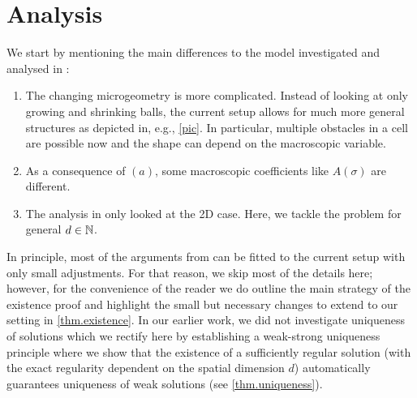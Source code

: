 \documentclass[reqno, 11pt]{amsart}
\numberwithin{equation}{section}
\def\N{{\Bbb N}}
\begin{document}
\section{Analysis}\label{analysis}
We start by mentioning the main differences to the model investigated and analysed in \cite{EdenNikolopoulosMuntean22}:


\begin{enumerate}
    \item[$(a)$] The changing microgeometry is more complicated. Instead of looking at only growing and shrinking balls, the current setup allows for much more general structures as depicted in, e.g., \cref{pic}.
    In particular, multiple obstacles in a cell are possible now and the shape can depend on the macroscopic variable.
    \item[$(b)$] As a consequence of $(a)$, some macroscopic coefficients like $A(\sigma)$ are different.
    \item[$(c)$] The analysis in \cite{EdenNikolopoulosMuntean22} only looked at the 2D case. Here, we tackle the problem for general $d\in\N$.
\end{enumerate}
%


In principle, most of the arguments from \cite{EdenNikolopoulosMuntean22} can be fitted to the current setup with only small adjustments.
For that reason, we skip most of the details here; however, for the convenience of the reader we do outline the main strategy of the existence proof and highlight the small but necessary changes to extend  \cite[Theorem 11]{EdenNikolopoulosMuntean22} to our setting in \cref{thm.existence}.
In our earlier work, we did not investigate uniqueness of solutions which we rectify here by establishing a weak-strong uniqueness principle where we show that the existence of a sufficiently regular solution (with the exact regularity dependent on the spatial dimension $d$) automatically guarantees uniqueness of weak solutions (see \cref{thm.uniqueness}).
\end{document}
